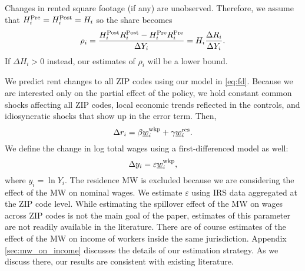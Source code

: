 Changes in rented square footage (if any) are unobserved.
Therefore, we assume that
$H^{\text{Pre}}_i = H^{\text{Post}}_i = H_i$ 
so the share becomes
\begin{equation}\label{eq:share_pocketed}
    \rho_i = \frac{H^{\text{Post}}_i R^{\text{Post}}_i - H^{\text{Pre}}_i R^{\text{Pre}}_i}{\Delta Y_i} = 
                H_i \frac{\Delta R_i}{\Delta Y_i} .
\end{equation}
If $\Delta H_i > 0$ instead, our estimates of $\rho_i$ will be a lower bound.

We predict rent changes to all ZIP codes using our model in \eqref{eq:fd}.
Because we are interested only on the partial effect of the policy, we
hold constant common shocks affecting all ZIP codes,
local economic trends reflected in the controls, and
idiosyncratic shocks that show up in the error term.
Then,
\begin{equation}\label{eq:cf_rents_model}
    \Delta r_i = \beta \underline{w}_i^{\text{wkp}} + \gamma \underline{w}_i^{\text{res}} .
\end{equation}
We define the change in log total wages using a first-differenced model as well:
\begin{equation}\label{eq:cf_wages_model}
    \Delta y_i = \varepsilon \underline{w}_i^{\text{wkp}} ,
\end{equation}
where $y_i=\ln Y_i$.
The residence MW is excluded because we are considering the effect of the MW on 
nominal wages.
We estimate $\varepsilon$ using IRS data aggregated at the ZIP code level.
While estimating the spillover effect of the MW on wages across ZIP codes is 
not the main goal of the paper, 
estimates of this parameter are not readily available in the literature.
There are of course estimates of the effect of the MW on income of workers
inside the same jurisdiction.
Appendix \ref{sec:mw_on_income} discusses the details of our estimation 
strategy.
As we discuss there, our results are consistent with existing literature.

%
%
%

